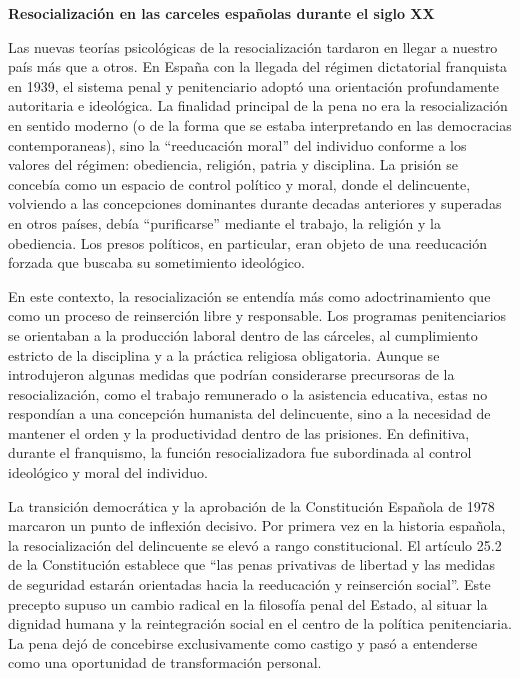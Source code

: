 \documentclass[
  spanish,
  letterpaper,
  DIV=11,
  numbers=noendperiod]{scrreprt}
\begin{document}
\begin{tcolorbox}[enhanced jigsaw, bottomtitle=1mm, toprule=.15mm, colbacktitle=quarto-callout-note-color!10!white, bottomrule=.15mm, leftrule=.75mm, colframe=quarto-callout-note-color-frame, opacitybacktitle=0.6, titlerule=0mm, breakable, colback=white, left=2mm, arc=.35mm, title=\textcolor{quarto-callout-note-color}{\faInfo}\hspace{0.5em}{Nota}, toptitle=1mm, coltitle=black, rightrule=.15mm, opacityback=0]

\textbf{Resocialización en las carceles españolas durante el siglo XX}

Las nuevas teorías psicológicas de la resocialización tardaron en llegar
a nuestro país más que a otros. En España con la llegada del régimen
dictatorial franquista en 1939, el sistema penal y penitenciario adoptó
una orientación profundamente autoritaria e ideológica. La finalidad
principal de la pena no era la resocialización en sentido moderno (o de
la forma que se estaba interpretando en las democracias contemporaneas),
sino la ``reeducación moral'' del individuo conforme a los valores del
régimen: obediencia, religión, patria y disciplina. La prisión se
concebía como un espacio de control político y moral, donde el
delincuente, volviendo a las concepciones dominantes durante decadas
anteriores y superadas en otros países, debía ``purificarse'' mediante
el trabajo, la religión y la obediencia. Los presos políticos, en
particular, eran objeto de una reeducación forzada que buscaba su
sometimiento ideológico.

En este contexto, la resocialización se entendía más como
adoctrinamiento que como un proceso de reinserción libre y responsable.
Los programas penitenciarios se orientaban a la producción laboral
dentro de las cárceles, al cumplimiento estricto de la disciplina y a la
práctica religiosa obligatoria. Aunque se introdujeron algunas medidas
que podrían considerarse precursoras de la resocialización, como el
trabajo remunerado o la asistencia educativa, estas no respondían a una
concepción humanista del delincuente, sino a la necesidad de mantener el
orden y la productividad dentro de las prisiones. En definitiva, durante
el franquismo, la función resocializadora fue subordinada al control
ideológico y moral del individuo.

La transición democrática y la aprobación de la Constitución Española de
1978 marcaron un punto de inflexión decisivo. Por primera vez en la
historia española, la resocialización del delincuente se elevó a rango
constitucional. El artículo 25.2 de la Constitución establece que ``las
penas privativas de libertad y las medidas de seguridad estarán
orientadas hacia la reeducación y reinserción social''. Este precepto
supuso un cambio radical en la filosofía penal del Estado, al situar la
dignidad humana y la reintegración social en el centro de la política
penitenciaria. La pena dejó de concebirse exclusivamente como castigo y
pasó a entenderse como una oportunidad de transformación personal.


\end{tcolorbox}
\end{document}
